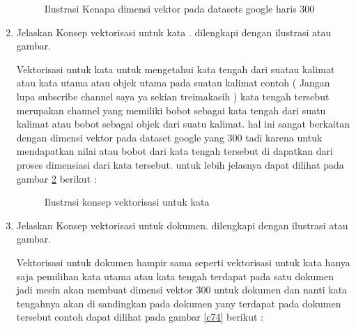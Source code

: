 \begin{enumerate}
\begin{figure}[!htbp]
      \caption{Ilustrasi Kenapa dimensi vektor pada datasets google haris 300}
      \label{c72}
      \end{figure}

\item Jelaskan Konsep vektorisasi untuk kata . dilengkapi dengan ilustrasi atau gambar. \par
Vektorisasi untuk kata untuk mengetahui kata tengah dari suatau kalimat atau kata utama atau objek utama pada suatau kalimat contoh ( Jangan lupa subscribe channel saya ya sekian treimakasih ) kata tengah tersebut merupakan channel yang memiliki bobot sebagai kata tengah dari suatu kalimat atau bobot sebagai objek dari suatu kalimat. hal ini sangat berkaitan dengan dimensi vektor pada dataset google yang 300 tadi karena untuk mendapatkan nilai atau bobot dari kata tengah tersebut di dapatkan dari proses dimensiasi dari kata tersebut. untuk lebih jelasnya dapat dilihat pada gambar \ref{c73} berikut :

\begin{figure}[!htbp]
      \caption{Ilustrasi konsep vektorisasi untuk kata}
      \label{c73}
      \end{figure}

\item Jelaskan Konsep vektorisasi untuk dokumen. dilengkapi dengan ilustrasi atau gambar. \par
Vektorisasi untuk dokumen hampir sama seperti vektorisasi untuk kata hanya saja pemilihan kata utama atau kata tengah terdapat pada satu dokumen jadi mesin akan membuat dimensi vektor 300 untuk dokumen dan nanti kata tengahnya akan di sandingkan pada dokumen yany terdapat pada dokumen tersebut contoh dapat dilihat pada gambar \ref{c74} berikut : 


\end{enumerate}
